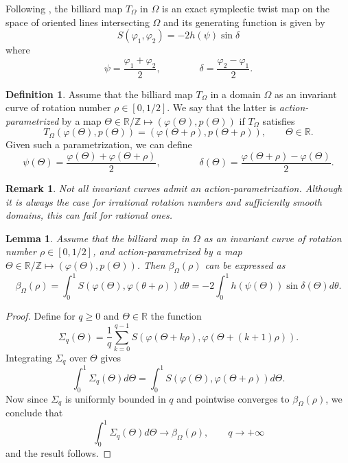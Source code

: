 \documentclass[a4paper]{article}
\newtheorem{lemma}{Lemma}
\newtheorem{remark}{Remark}
\theoremstyle{definition}
\newtheorem{definition}{Definition}
\def\R{\mathbb{R}}
\def\Z{\mathbb{Z}}
\begin{document}
Following \cite[Proposition 3.1]{Bialyellipses}, the billiard map $T_{\Omega}$ in $\Omega$ is an exact symplectic twist map on the space of oriented lines intersecting $\Omega$ and its generating function is given by
\[
S(\varphi_1,\varphi_2) = -2h(\psi)\sin\delta
\]
where
\[
\psi=\frac{\varphi_1+\varphi_2}{2},
\qquad\qquad
\delta=\frac{\varphi_2-\varphi_1}{2}.
\]

\begin{definition}
Assume that the billiard map $T_{\Omega}$ in a domain $\Omega$ as an invariant curve of rotation number $\rho\in[0,1/2]$. We say that the latter is \textit{action-parametrized} by a map $\Theta\in\R/\Z\mapsto (\varphi(\Theta),p(\Theta))$ if $T_{\Omega}$ satisfies
    \[
    T_{\Omega}(\varphi(\Theta),p(\Theta)) = (\varphi(\Theta+\rho),p(\Theta+\rho)),\qquad \Theta\in\R.
    \]
Given such a parametrization, we can define
\[
\psi(\Theta)=\frac{\varphi(\Theta)+\varphi(\Theta+\rho)}{2},
\qquad\qquad
\delta(\Theta)=\frac{\varphi(\Theta+\rho)-\varphi(\Theta)}{2}.
\]
\end{definition}

\begin{remark}
    Not all invariant curves admit an action-parametrization. Although it is always the case for irrational rotation numbers and sufficiently smooth domains, this can fail for rational ones.
\end{remark}

\begin{lemma}
\label{lemma:Mather_beta}
    Assume that the billiard map in $\Omega$ as an invariant curve of rotation number $\rho\in[0,1/2]$, and action-parametrized by a map $\Theta\in\R/\Z\mapsto (\varphi(\Theta),p(\Theta))$.
    Then $\beta_{\Omega}(\rho)$ can be expressed as
    \[
    \beta_{\Omega}(\rho) = \int_0^1S(\varphi(\Theta),\varphi(\theta+\rho))d\theta = -2\int_0^1 h(\psi(\Theta))\sin\delta(\Theta)d\theta.
    \]
\end{lemma}

\begin{proof}
    Define for $q\geq 0$ and $\Theta\in\R$ the function
    \[
    \Sigma_q(\Theta) = \frac{1}{q}\sum_{k=0}^{q-1}S(\varphi(\Theta+k\rho),\varphi(\Theta+(k+1)\rho)).
    \]
    Integrating $\Sigma_q$ over $\Theta$ gives
    \[
    \int_0^1 \Sigma_q(\Theta) d\Theta = \int_0^1 S(\varphi(\Theta),\varphi(\Theta+\rho))d\Theta.
    \]
    Now since $\Sigma_q$ is uniformly bounded in $q$ and pointwise converges to $\beta_{\Omega}(\rho)$, we conclude that
    \[
    \int_0^1 \Sigma_q(\Theta) d\Theta\longrightarrow\beta_{\Omega}(\rho),\qquad q\longrightarrow+\infty
    \]
    and the result follows.
\end{proof}
\end{document}
